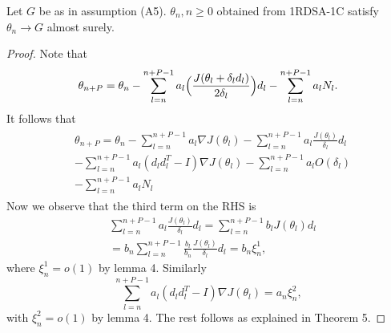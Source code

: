 \begin{theorem}
 Let $G$ be as in assumption (A5). $\theta_n, n\geq0$ obtained from 1RDSA-1C satisfy $\theta_n \rightarrow G$
 almost surely.
\end{theorem}
\begin{proof}
Note that
 \begin{align*}
 \theta_{n+P} = \theta_n-\sum_{l=n}^{n+P-1}a_l\Big{(}\frac{J(\theta_l+\delta_l d_l)}{2\delta_l}\Big{)}d_l-\sum_{l=n}^{n+P-1}a_lN_{l}.
 \end{align*} 
It follows that
 \begin{align*}
  \begin{split}
  & \theta_{n+P} = \theta_n- \sum_{l=n}^{n+P-1}a_l\nabla J(\theta_l) 
  -\sum_{l=n}^{n+P-1}a_l\frac{J(\theta_l)}{\delta_l}d_l\\
  &-\sum_{l=n}^{n+P-1}a_l(d_ld_l^T-I)\nabla J(\theta_l)-\sum_{l=n}^{n+P-1}a_lO(\delta_l)\\
  &-\sum_{l=n}^{n+P-1}a_lN_{l}
 \end{split}
 \end{align*}
 Now we observe that the third term on the RHS is
 \begin{align*}
 & \sum_{l=n}^{n+P-1}a_l\frac{J(\theta_l)}{\delta_l}d_l= \sum_{l=n}^{n+P-1} b_{l}J(\theta_l)d_l\\
 & = b_n\sum_{l=n}^{n+P-1}\frac{b_l}{b_n}\frac{J(\theta_l)}{\delta_l}d_l=b_n\xi^{1}_{n},
 \end{align*}
 where $\xi^{1}_{n}=o(1)$ by lemma 4. Similarly
 $$\sum_{l=n}^{n+P-1}a_l(d_ld_l^T-I)\nabla J(\theta_l)=a_n\xi^{2}_{n},$$
 with $\xi^{2}_{n}=o(1)$ by lemma 4.
 The rest follows as explained in Theorem 5.
\end{proof}
